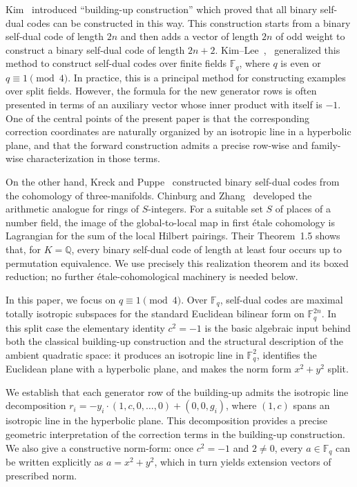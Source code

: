 \documentclass[12pt]{article}
\newcommand{\F}{\mathbb{F}}
\begin{document}
Kim~\cite{Kim2001} introduced ``building-up construction'' which proved that all binary self-dual codes can be constructed in this way. This construction starts from a binary self-dual code of length $2n$ and then adds a vector of length $2n$ of odd weight to construct a binary self-dual code of length $2n+2$. Kim--Lee~\cite{KimLee2009},~\cite{KimLee} generalized this method to construct self-dual codes over finite fields $\mathbb F_q$, where $q$ is even or $q \equiv 1 \pmod{4}$.
 In practice, this is a principal method for constructing examples over split fields. However, the formula for the new generator rows is often presented in terms of an auxiliary vector whose inner product with itself is $-1$. One of the central points of the present paper is that the corresponding correction coordinates are naturally organized by an isotropic line in a hyperbolic plane, and that the forward construction admits a precise row-wise and family-wise characterization in those terms.

 On the other hand, Kreck and Puppe~\cite{KreckPuppe} constructed binary
self-dual codes from the cohomology of three-manifolds. Chinburg and
Zhang~\cite{ChinburgZhang} developed the arithmetic analogue for rings of
$S$-integers. For a suitable set $S$ of places of a number field, the image
of the global-to-local map in first \'{e}tale cohomology is Lagrangian for
the sum of the local Hilbert pairings. Their Theorem~1.5 shows that, for
$K=\mathbb Q$, every binary self-dual code of length at least four occurs up
to permutation equivalence. We use precisely this realization theorem and
its boxed reduction; no further \'{e}tale-cohomological machinery is needed
below.

In this paper, we focus on $q \equiv 1 \pmod 4$. Over $\F_q$, self-dual codes are maximal totally isotropic subspaces for the standard Euclidean bilinear form on $\F_q^{2n}$. In this split case the elementary identity $c^2=-1$ is the basic algebraic input behind both the classical building-up construction and the structural description of the ambient quadratic space: it produces an isotropic line in $\F_q^2$, identifies the Euclidean plane with a hyperbolic plane, and makes the norm form $x^2+y^2$ split.


We establish that each generator row of the building-up admits the isotropic line decomposition $r_i = -y_i \cdot (1, c, 0, \ldots, 0) + (0, 0, g_i)$, where $(1, c)$ spans an isotropic line in the hyperbolic plane. This decomposition provides a precise geometric interpretation of the correction terms in the building-up construction. We also give a constructive norm-form: once $c^2=-1$ and $2\neq 0$, every $a\in\F_q$ can be written explicitly as $a=x^2+y^2$, which in turn yields extension vectors of prescribed norm.
\end{document}
